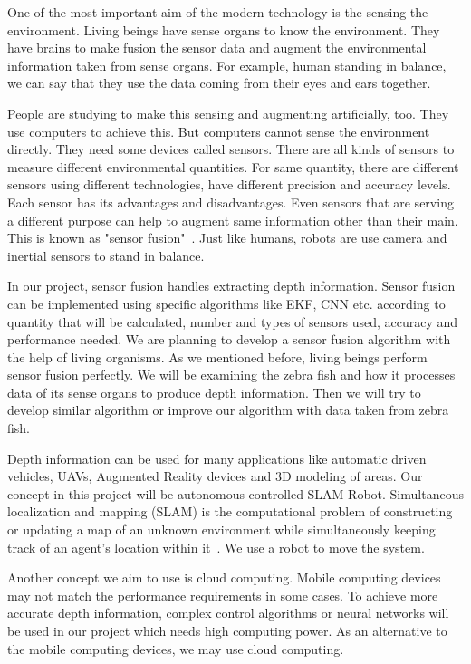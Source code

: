 \documentclass[12pt]{article}
\begin{document}
One of the most important aim of the modern technology is the sensing the environment. Living beings have sense organs to know the environment. They have brains to make fusion the sensor data and augment the environmental information taken from sense organs. For example, human standing in balance, we can say that they use the data coming from their eyes and ears together.

People are studying to make this sensing and augmenting artificially, too. They use computers to achieve this. But computers cannot sense the environment directly. They need some devices called sensors. There are all kinds of sensors to measure different environmental quantities. For same quantity, there are different sensors using different technologies, have different precision and accuracy levels. Each sensor has its advantages and disadvantages. Even sensors that are serving a different purpose can help to augment same information other than their main. This is known as "sensor fusion"~\cite{enwiki:1115352853}. Just like humans, robots are use camera and inertial sensors to stand in balance.

In our project, sensor fusion handles extracting depth information. Sensor fusion can be implemented using specific algorithms like EKF, CNN etc. according to quantity that will be calculated, number and types of sensors used, accuracy and performance needed. We are planning to develop a sensor fusion algorithm with the help of living organisms. As we mentioned before, living beings perform sensor fusion perfectly. We will be examining the zebra fish and how it processes data of its sense organs to produce depth information. Then we will try to develop similar algorithm or improve our algorithm with data taken from zebra fish.

Depth information can be used for many applications like automatic driven vehicles, UAVs, Augmented Reality devices and 3D modeling of areas. Our concept in this project will be autonomous controlled SLAM Robot. Simultaneous localization and mapping (SLAM) is the computational problem of constructing or updating a map of an unknown environment while simultaneously keeping track of an agent's location within it~\cite{enwiki:1120084976}. We use a robot to move the system.

Another concept we aim to use is cloud computing. Mobile computing devices may not match the performance requirements in some cases. To achieve more accurate depth information, complex control algorithms or neural networks will be used in our project which needs high computing power. As an alternative to the mobile computing devices, we may use cloud computing.
\end{document}
